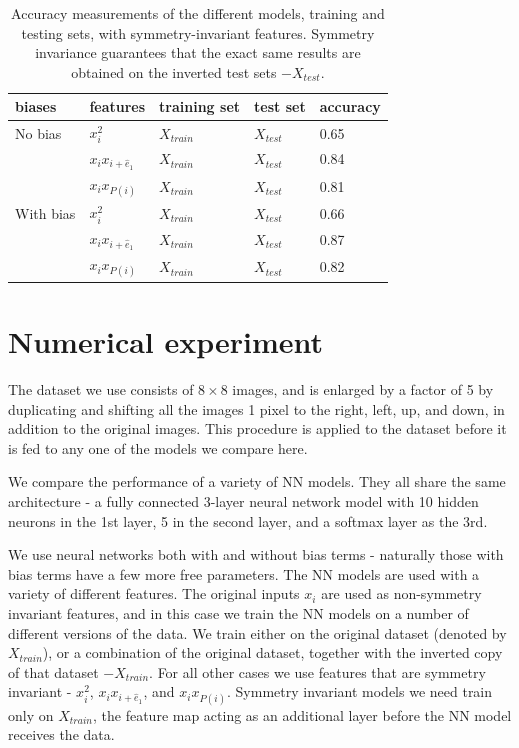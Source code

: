 \documentclass[twocolumn, nofootinbib, aps, prb]{revtex4-1}
\begin{document}
\begin{table}
	\begin{tabular}{l l l l | l}
		biases & features & training set & test set & accuracy \\ 
		\hline
		No bias & $x_i^2$ & $X_{train}$ & $X_{test}$ & 0.65 \\
		\cline{2-5}
		 & $x_i x_{i + {\hat e}_1}$ & $X_{train}$ & $X_{test}$ & 0.84 \\
		\cline{2-5}
		 & $x_i x_{P(i)}$ & $X_{train}$ & $X_{test}$ & 0.81 \\ 
		\hline
		\hline
		With bias & $x_i^2$ & $X_{train}$ & $X_{test}$ & 0.66 \\
		\cline{2-5}
		 & $x_i x_{i + {\hat e}_1}$ & $X_{train}$ & $X_{test}$ & 0.87 \\	
		\cline{2-5}
		 & $x_i x_{P(i)}$ & $X_{train}$ & $X_{test}$ & 0.82 \\	
		\hline
	\end{tabular}
	\caption{Accuracy measurements of the different models, training and testing sets, with symmetry-invariant features. Symmetry invariance guarantees that the exact same results are obtained on the inverted test sets $-X_{test}$.}
	\label{table:results_table_symmetric}
\end{table}


\section{Numerical experiment}\label{Sec:empirics}

The dataset we use\cite{Dua:2017} consists of $8 \times 8$ images, and is enlarged by a factor of 5 by duplicating and shifting all the images 1 pixel to the right, left, up, and down, in addition to the original images. This procedure is applied to the dataset before it is fed to any one of the models we compare here.

We compare the performance of a variety of NN models. They all share the same architecture - a fully connected 3-layer neural network model with 10 hidden neurons in the 1st layer, 5 in the second layer, and a softmax layer as the 3rd. 

We use neural networks both with and without bias terms - naturally those with bias terms have a few more free parameters. The NN models are used with a variety of different features. The original inputs $x_i$ are used as non-symmetry invariant features, and in this case we train the NN models on a number of different versions of the data. We train either on the original dataset (denoted by $X_{train}$), or a combination of the original dataset, together with the inverted copy of that dataset $-X_{train}$. For all other cases we use features that are symmetry invariant - $x_i^2$, $x_i x_{i + {\hat e}_1}$, and $x_i x_{P(i)}$. Symmetry invariant models we need train only on $X_{train}$, the feature map acting as an additional layer before the NN model receives the data.
\end{document}
